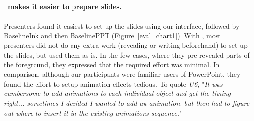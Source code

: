 %
\textbf{\interface\ makes it easier to prepare slides.}\\
\\
Presenters found it easiest to set up the slides using our interface, followed by BaselineInk and then BaselinePPT (Figure~\ref{eval_chart1}). With \interface, most presenters did not do any extra work (revealing or writing beforehand) to set up the slides, but used them as-is. In the few cases, where they pre-revealed parts of the foreground, they expressed that the required effort was minimal. 
%
In comparison, although our participants were familiar users of PowerPoint, they found the effort to setup animation effects tedious. To quote \textit{U6}, "\textit{It was cumbersome to add animations to each individual object and get the timing right... sometimes I decided I wanted to add an animation, but then had to figure out where to insert it in the existing animations sequence.}"
